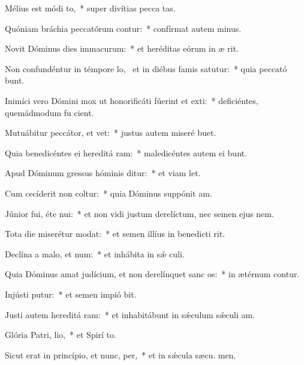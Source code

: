 \item Mélius est módi to,~* super divítias pecca tas.
\item Quóniam bráchia peccatórum contur:~* confírmat autem  minus.
\item Novit Dóminus dies immacurum:~* et heréditas eórum in æ rit.
\item Non confundéntur in témpore lo,~\pscross{} et in diébus famis satutur:~* quia peccató bunt.
\item Inimíci vero Dómini mox ut honorificáti fúerint et exti:~* deficiéntes, quemádmodum fu cient.
\item Mutuábitur peccátor, et  vet:~* justus autem miseré  buet.
\item Quia benedicéntes ei hereditá ram:~* maledicéntes autem ei bunt.
\item Apud Dóminum gressus hóminis ditur:~* et viam  let.
\item Cum cecíderit non coltur:~* quia Dóminus suppónit  am.
\item Júnior fui, éte nui:~* et non vidi justum derelíctum, nec semen ejus  nem.
\item Tota die miserétur  modat:~* et semen illíus in benedicti rit.
\item Declína a malo, et  num:~* et inhábita in sǽ culi.
\item Quia Dóminus amat judícium, et non derelínquet sanc os:~* in ætérnum contur.
\item Injústi putur:~* et semen impió bit.
\item Justi autem hereditá ram:~* et inhabitábunt in sǽculum sǽculi  am.
\item Glória Patri,  lio,~* et Spirí to.
\item Sicut erat in princípio, et nunc,  per,~* et in sǽcula sæcu. men.
